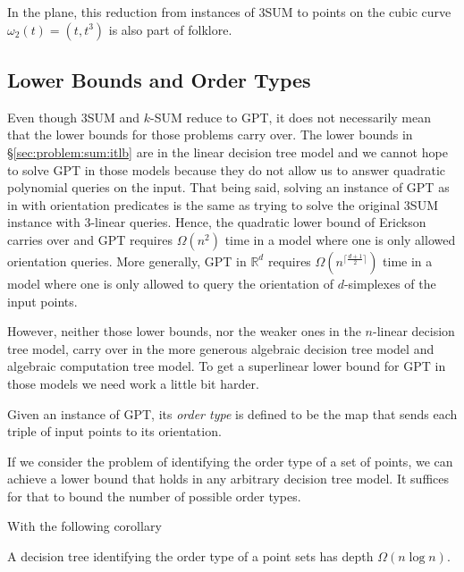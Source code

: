 In the plane, this reduction from instances of 3SUM to points on
the cubic curve \(\omega_2(t) = (t, t^3)\) is also part of folklore.

\subsection{Lower Bounds and Order Types}%
\label{sec:problem:pol:lb}

Even though 3SUM and \(k\)-SUM reduce to GPT, it does not necessarily mean that
the lower bounds for those problems carry over.
%
The lower bounds in
\S\ref{sec:problem:sum:itlb} are in the linear decision tree model and we
cannot hope to solve GPT in those models because they do not allow us to answer
quadratic polynomial queries on the input.
%
That being said, solving an instance of GPT as in  with
orientation predicates is the same as trying to solve the original 3SUM
instance with \(3\)-linear queries. Hence, the quadratic lower bound of
Erickson~\cite{Er99a} carries over and GPT requires \(\Omega(n^2)\) time in a
model where one is only allowed orientation queries. More generally, GPT in
\(\mathbb{R}^d\) requires \(\Omega(n^{\lceil \frac{d+1}{2} \rceil})\) time in a
model where one is only allowed to query the orientation of \(d\)-simplexes of
the input points.

However, neither those lower bounds, nor the weaker ones in the \(n\)-linear
decision tree model, carry over in the more generous algebraic decision
tree model and algebraic computation tree model.
%
To get a superlinear lower bound for GPT in those models we need work a little
bit harder.

Given an instance of GPT, its \emph{order type} is defined to be the map that
sends each triple of input points to its orientation.
%

%
If we consider the problem of identifying the order type of a set of points, we
can achieve a lower bound that holds in any arbitrary decision tree model. It
suffices for that to bound the number of possible order types.
%

%
With the following corollary
\begin{corollary}
    A decision tree identifying the order type of a point sets has depth
    \(\Omega(n \log n)\).
\end{corollary}


